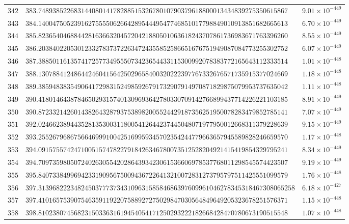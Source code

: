 \documentclass[12pt,reqno]{amsart}
\theoremstyle{remark}
\begin{document}
\begin{longtable}{clc}
$342$ & $383.7489385226831440801417828851532678010790379618800013434839275350615867$ & $9.01\times 10^{-449}$ \\
$343$ & $384.1400475052391627555506266428954449547746851017798849010913851682665613$ & $6.70\times 10^{-449}$ \\
$344$ & $385.8236540468844281636632045720421880501063618243707861736983671763396260$ & $8.55\times 10^{-449}$ \\
$345$ & $386.2038402205301233278373722634724355852586651676751949087084773255302752$ & $6.07\times 10^{-449}$ \\
$346$ & $387.3885011613574172577349555073423654433115300992078383772165643112333514$ & $1.01\times 10^{-448}$ \\
$347$ & $388.1307884124864424604156425029658400320222397767332676571735915377024669$ & $1.18\times 10^{-448}$ \\
$348$ & $389.3859483835490641729831524985926791732907914970871829875079953737635042$ & $1.11\times 10^{-448}$ \\
$349$ & $390.4180146438784650293157401309693642780330709142766899437714226221103185$ & $8.91\times 10^{-449}$ \\
$350$ & $390.8723321426014382643287937538982005524429187356251950078283479852785141$ & $7.07\times 10^{-449}$ \\
$351$ & $392.0246623894435281353003118005412644237445048071977950012668311379228639$ & $9.15\times 10^{-449}$ \\
$352$ & $393.2552679686756646999100425169959345702354244779663657945589828246659570$ & $1.17\times 10^{-448}$ \\
$353$ & $394.0915755742471005157478227918426346780073512528204921415419854329795241$ & $8.34\times 10^{-449}$ \\
$354$ & $394.7097359805072402630554202864393423061536606978537768011298545574423507$ & $9.19\times 10^{-449}$ \\
$355$ & $395.8407338499694233190956750094367226413210072831273795797511425551099579$ & $1.76\times 10^{-448}$ \\
$356$ & $397.313968222348245037773734310963158584686397609961046278345318467308065258$ & $6.18\times 10^{-427}$ \\
$357$ & $397.4101657539075463591192207588927275029847030564849649205323678251576371$ & $1.15\times 10^{-448}$ \\
$358$ & $398.8102380745682315033631619454054171250293222182668428470780673190515548$ & $1.07\times 10^{-448}$ \\

\end{longtable}
\end{document}
